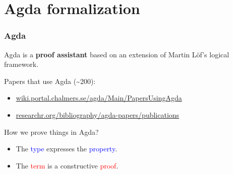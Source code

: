 \documentclass[xcolor={x11names}]{beamer}
\begin{document}
\section{Agda formalization}
\begin{frame}[fragile]
  \frametitle{Agda}
  Agda is a \textbf{proof assistant} based on an extension of Martin Löf's
  logical framework.

  \vspace{0.3cm}
  \pause{}
  Papers that use Agda (\textasciitilde{}200):

  \begin{itemize}
  \item \href{https://wiki.portal.chalmers.se/agda/Main/PapersUsingAgda}{wiki.portal.chalmers.se/agda/Main/PapersUsingAgda}

  \item \href{https://researchr.org/bibliography/agda-papers/publications}{researchr.org/bibliography/agda-papers/publications}
  \end{itemize}

  \pause{}

  \vspace{0.3cm}
  How we prove things in Agda?
  \begin{itemize}
  \item The \textcolor{blue}{type} expresses the \textcolor{blue}{property}.
  \item The \textcolor{red}{term} is a constructive \textcolor{red}{proof}.
  \end{itemize}

\end{frame}

\end{document}
